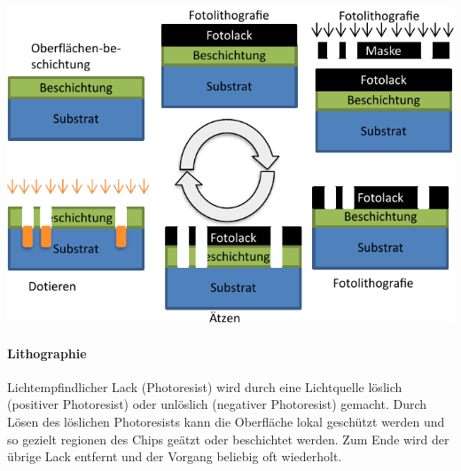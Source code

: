 \begin{minipage}[t]{0.5\columnwidth}
    \includegraphics[width=\columnwidth, align=t]{images/technologie_grundprozess_skript.pdf}
\end{minipage}
\hfill
\begin{minipage}[t]{0.48\columnwidth}
    \paragraph{Lithographie}
    Lichtempfindlicher Lack (Photoresist) wird durch eine Lichtquelle löslich (positiver Photoresist) oder unlöslich (negativer Photoresist) gemacht.
    Durch Lösen des löslichen Photoresists kann die Oberfläche lokal geschützt werden und so gezielt regionen des Chips geätzt oder beschichtet werden.
    Zum Ende wird der übrige Lack entfernt und der Vorgang beliebig oft wiederholt.
\end{minipage}




